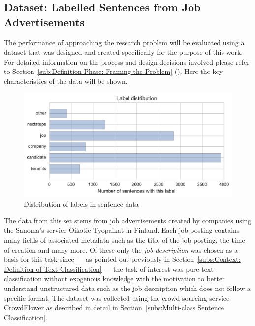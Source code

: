 \subsection{Dataset: Labelled Sentences from Job Advertisements}
\label{subs:Dataset: Labelled Sentences from Job Advertisements}

The performance of approaching the research problem will be evaluated using a dataset that was designed and created specifically for the purpose of this work. For detailed information on the process and design decisions involved please refer to Section~\ref{sub:Definition Phase: Framing the Problem} (). Here the key characteristics of the data will be shown.

\begin{figure}[h]
    \centering
    \includegraphics[width=\textwidth]{img/sentence-data-label-dist.pdf}
    \caption{Distribution of labels in sentence data}
\label{fig:sentence-data-label-dist}
\end{figure}

The data from this set stems from job advertisements created by companies using the \gls{Sanoma}'s service \gls{Oikotie Tyopaikat} in Finland. Each job posting contains many fields of associated metadata such as the title of the job posting, the time of creation and many more. Of these only the \emph{job description} was chosen as a basis for this task since --- as pointed out previously in Section~\ref{subs:Context: Definition of Text Classification} --- the task of interest was pure text classification without exogenous knowledge with the motivation to better understand unstructured data such as the job description which does not follow a specific format. The dataset was collected using the \gls{crowd sourcing} service \gls{CrowdFlower} as described in detail in Section~\ref{subs:Multi-class Sentence Classification}.

